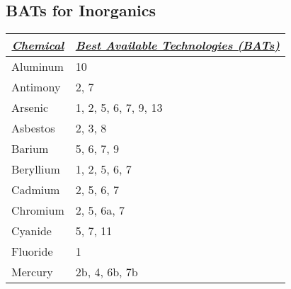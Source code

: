 \subsection{BATs for Inorganics}  

\begin{table}[]
\begin{tabular}{|l|l|}
\hline
\multicolumn{1}{|c|}{{\ul \textit{\textbf{Chemical}}}} & \multicolumn{1}{c|}{{\ul \textit{\textbf{Best Available Technologies (BATs)}}}} \\ \hline
Aluminum                                               & 10                                                                              \\ \hline
Antimony                                               & 2, 7                                                                            \\ \hline
Arsenic                                                & 1, 2, 5, 6, 7, 9, 13                                                            \\ \hline
Asbestos                                               & 2, 3, 8                                                                         \\ \hline
Barium                                                 & 5, 6, 7, 9                                                                      \\ \hline
Beryllium                                              & 1, 2, 5, 6, 7                                                                   \\ \hline
Cadmium                                                & 2, 5, 6, 7                                                                      \\ \hline
Chromium                                               & 2, 5, 6a, 7                                                                     \\ \hline
Cyanide                                                & 5, 7, 11                                                                        \\ \hline
Fluoride                                               & 1                                                                               \\ \hline
Mercury                                                & 2b, 4, 6b, 7b                                                                   \\ \hline

\end{tabular}
\end{table}
